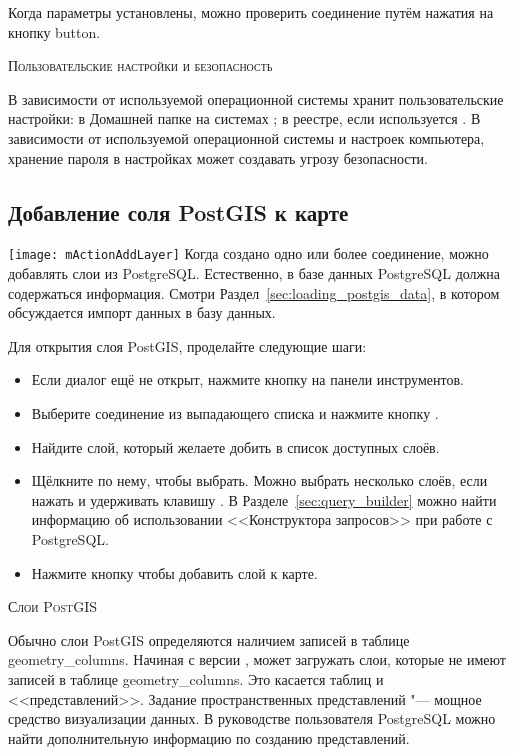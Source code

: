 Когда параметры установлены, можно проверить соединение путём нажатия
на кнопку  button.

\begin{Tip}\caption{\textsc{\qg Пользовательские настройки и безопасность}}
В зависимости от используемой операционной системы \qg хранит
пользовательские настройки: в Домашней папке на \nix системах
; в реестре, если используется \win. В зависимости
от используемой операционной системы и настроек компьютера, хранение пароля
в настройках \qg может создавать угрозу безопасности.
\end{Tip}

\subsection{Добавление соля PostGIS к карте}

\texttt{[image: mActionAddLayer]} Когда создано одно или
более соединение, можно добавлять слои из PostgreSQL. Естественно, в базе
данных PostgreSQL должна содержаться информация. Смотри
Раздел~\ref{sec:loading_postgis_data}, в котором обсуждается импорт данных
в базу данных.

Для открытия слоя PostGIS, проделайте следующие шаги:

\begin{itemize}[label=--]
\item Если диалог  ещё не открыт, нажмите
кнопку  на панели
инструментов.
\item Выберите соединение из выпадающего списка и нажмите кнопку
.
\item Найдите слой, который желаете добить в список доступных слоёв.
\item Щёлкните по нему, чтобы выбрать. Можно выбрать несколько слоёв,
если нажать и удерживать клавишу . В
Разделе~\ref{sec:query_builder} можно найти информацию об использовании
<<Конструктора запросов>> при работе с PostgreSQL.
\item Нажмите кнопку  чтобы добавить слой к карте.
\end{itemize}

\begin{Tip}\caption{\textsc{Слои PostGIS}}
Обычно слои PostGIS определяются наличием записей в таблице
geometry\_columns. Начиная с версии \OLD %
, \qg может загружать слои, которые не имеют записей в таблице
geometry\_columns. Это касается таблиц и <<представлений>>. %
Задание пространственных представлений "--- мощное средство визуализации данных.
В руководстве пользователя PostgreSQL можно найти дополнительную информацию
по созданию представлений.
\end{Tip}

